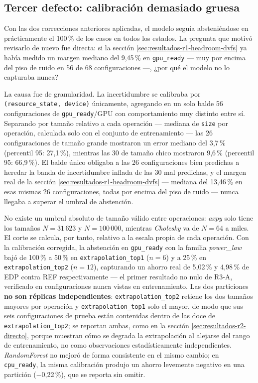 \documentclass[12pt,oneside,spanish]{book}
\begin{document}
\subsection{Tercer defecto: calibración demasiado gruesa}
\label{sec:resultados-r3-calibracion-tamano}

Con las dos correcciones anteriores aplicadas, el modelo seguía absteniéndose en prácticamente el 100\,\% de los casos en todos los estados. La pregunta que motivó revisarlo de nuevo fue directa: si la sección \ref{sec:resultados-r1-headroom-dvfs} ya había medido un margen mediano del 9,45\,\% en \texttt{gpu\_ready} --- muy por encima del piso de ruido en 56 de 68 configuraciones ---, ¿por qué el modelo no lo capturaba nunca?

La causa fue de granularidad. La incertidumbre se calibraba por \texttt{(resource\_state, device)} únicamente, agregando en un solo balde 56 configuraciones de \texttt{gpu\_ready}/GPU con comportamiento muy distinto entre sí. Separando por tamaño relativo a cada operación --- mediana de \texttt{size} por operación, calculada solo con el conjunto de entrenamiento --- las 26 configuraciones de tamaño grande mostraron un error mediano del 3,7\,\% (percentil 95: 27,1\,\%), mientras las 30 de tamaño chico mostraron 9,6\,\% (percentil 95: 66,9\,\%). El balde único obligaba a las 26 configuraciones bien predichas a heredar la banda de incertidumbre inflada de las 30 mal predichas, y el margen real de la sección \ref{sec:resultados-r1-headroom-dvfs} --- mediana del 13,46\,\% en esas mismas 26 configuraciones, todas por encima del piso de ruido --- nunca llegaba a superar el umbral de abstención.

No existe un umbral absoluto de tamaño válido entre operaciones: \textit{axpy} solo tiene los tamaños $N=31\,623$ y $N=100\,000$, mientras \textit{Cholesky} va de $N=64$ a miles. El corte se calcula, por tanto, relativo a la escala propia de cada operación. Con la calibración corregida, la abstención en \texttt{gpu\_ready} con la familia \textit{power\_law} bajó de 100\,\% a 50\,\% en \texttt{extrapolation\_top1} ($n=6$) y a 25\,\% en \texttt{extrapolation\_top2} ($n=12$), capturando un ahorro real de 5,02\,\% y 4,98\,\% de EDP contra REF respectivamente --- el primer resultado no nulo de R3-A, verificado en configuraciones nunca vistas en entrenamiento. Las dos particiones \textbf{no son réplicas independientes}: \texttt{extrapolation\_top2} retiene los dos tamaños mayores por operación y \texttt{extrapolation\_top1} solo el mayor, de modo que sus seis configuraciones de prueba están contenidas dentro de las doce de \texttt{extrapolation\_top2}; se reportan ambas, como en la sección \ref{sec:resultados-r2-directo}, porque muestran cómo se degrada la extrapolación al alejarse del rango de entrenamiento, no como observaciones estadísticamente independientes. \textit{RandomForest} no mejoró de forma consistente en el mismo cambio; en \texttt{cpu\_ready}, la misma calibración produjo un ahorro levemente negativo en una partición ($-$0,22\,\%), que se reporta sin omitir.
\end{document}

